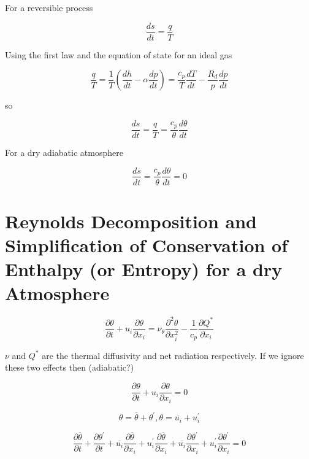 For a reversible process

\begin{equation}
\frac{ds}{dt} = \frac{q}{T}
\end{equation}

Using the first law and the equation of state for an ideal gas

\begin{equation}
\frac{q}{T} = \frac{1}{T} \left(\frac{dh}{dt} - \alpha \frac{dp}{dt}\right) =  \frac{c_{p}}{T} \frac{dT}{dt} - \frac{R_{d}}{p} \frac{dp}{dt}
\end{equation}

so

\begin{equation}
\frac{ds}{dt} = \frac{q}{T} =  \frac{c_{p}}{\theta}\frac{d\theta}{dt}
\end{equation}

For a dry adiabatic atmosphere

\begin{equation}
\frac{ds}{dt} =  \frac{c_{p}}{\theta}\frac{d\theta}{dt} = 0
\end{equation}

\section{Reynolds Decomposition and Simplification of Conservation of Enthalpy (or Entropy) for a dry Atmosphere}
\label{sec:rdent}
\begin{equation}
\frac{\partial \theta}{\partial t} + u_{i}\frac{\partial \theta}{\partial x_{i}} = \nu_{\theta} \frac{\partial^{2}\theta}{\partial x_{i}^{2}} - \frac{1}{c_{p}}\frac{\partial Q^{*}}{\partial x_{i}}
\end{equation}

$\nu$ and $Q^{*}$ are the thermal diffusivity and net radiation respectively.  If we ignore these two effects then (adiabatic?)

\begin{equation}
\frac{\partial \theta}{\partial t} + u_{i}\frac{\partial \theta}{\partial x_{i}} = 0
\end{equation}

\begin{equation}
\theta = \overline{\theta} + \theta^{'}, \theta = \overline{u_{i}} + u_{i}^{'} 
\end{equation}

\begin{equation}
\frac{\partial \overline{\theta}}{\partial t} + \frac{\partial \theta^{'}}{\partial t} + \overline{u_{i}}\frac{\partial \overline{\theta}}{\partial x_{i}} + u_{i}^{'}\frac{\partial \overline{\theta}}{\partial x_{i}} + \overline{u_{i}}\frac{\partial \theta^{'}}{\partial x_{i}} + u_{i}^{'}\frac{\partial \theta^{'}}{\partial x_{i}} = 0
\end{equation}


